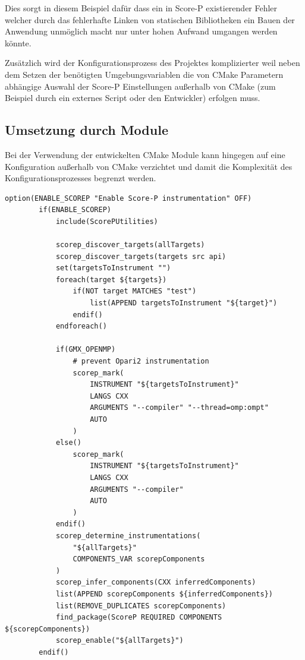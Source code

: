 \documentclass[german,proseminar,hyperref,utf8]{zihpub}
\begin{document}
    Dies sorgt in diesem Beispiel dafür dass ein in Score-P existierender Fehler welcher durch das
    fehlerhafte Linken von statischen Bibliotheken ein Bauen der Anwendung unmöglich macht
    nur unter hohen Aufwand umgangen werden könnte.

    Zusätzlich wird der Konfigurationsprozess des Projektes komplizierter weil neben dem Setzen der
    benötigten Umgebungsvariablen die von CMake Parametern abhängige Auswahl der Score-P Einstellungen
    außerhalb von CMake (zum Beispiel durch ein externes Script oder den Entwickler) erfolgen muss.

    \subsection{Umsetzung durch Module}
    Bei der Verwendung der entwickelten CMake Module kann hingegen auf eine Konfiguration außerhalb
    von CMake verzichtet und damit die Komplexität des Konfigurationsprozesses begrenzt werden.

    \begin{lstlisting}[caption=Anwendung der entwickelten Module bei GROMACS, gobble=8, showstringspaces=false, basicstyle=\small]
        option(ENABLE_SCOREP "Enable Score-P instrumentation" OFF)
        if(ENABLE_SCOREP)
            include(ScorePUtilities)
        
            scorep_discover_targets(allTargets)
            scorep_discover_targets(targets src api)
            set(targetsToInstrument "")
            foreach(target ${targets})
                if(NOT target MATCHES "test")
                    list(APPEND targetsToInstrument "${target}")
                endif()
            endforeach()
            
            if(GMX_OPENMP)
                # prevent Opari2 instrumentation
                scorep_mark(
                    INSTRUMENT "${targetsToInstrument}"
                    LANGS CXX
                    ARGUMENTS "--compiler" "--thread=omp:ompt"
                    AUTO
                )
            else()
                scorep_mark(
                    INSTRUMENT "${targetsToInstrument}"
                    LANGS CXX
                    ARGUMENTS "--compiler"
                    AUTO
                )
            endif()
            scorep_determine_instrumentations(
                "${allTargets}"
                COMPONENTS_VAR scorepComponents
            )
            scorep_infer_components(CXX inferredComponents)
            list(APPEND scorepComponents ${inferredComponents})
            list(REMOVE_DUPLICATES scorepComponents)
            find_package(ScoreP REQUIRED COMPONENTS ${scorepComponents})
            scorep_enable("${allTargets}")
        endif()
    \end{lstlisting}
\end{document}
